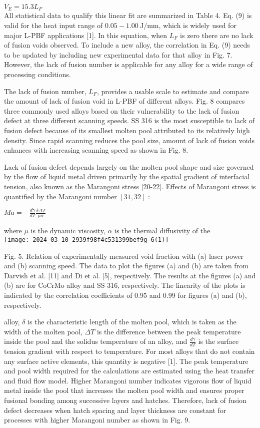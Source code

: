 \documentclass[10pt]{article}
\begin{document}
$V_{E}=15.3 L_{F}$\\
All statistical data to qualify this linear fit are summarized in Table 4. Eq. (9) is valid for the heat input range of $0.05-1.00 \mathrm{~J} / \mathrm{mm}$, which is widely used for major L-PBF applications [1]. In this equation, when $L_{F}$ is zero there are no lack of fusion voids observed. To include a new alloy, the correlation in Eq. (9) needs to be updated by including new experimental data for that alloy in Fig. 7. However, the lack of fusion number is applicable for any alloy for a wide range of processing conditions.

The lack of fusion number, $L_{F}$, provides a usable scale to estimate and compare the amount of lack of fusion void in L-PBF of different alloys. Fig. 8 compares three commonly used alloys based on their vulnerability to the lack of fusion defect at three different scanning speeds. SS 316 is the most susceptible to lack of fusion defect because of its smallest molten pool attributed to its relatively high density. Since rapid scanning reduces the pool size, amount of lack of fusion voids enhances with increasing scanning speed as shown in Fig. 8.

Lack of fusion defect depends largely on the molten pool shape and size governed by the flow of liquid metal driven primarily by the spatial gradient of interfacial tension, also known as the Marangoni stress [20-22]. Effects of Marangoni stress is quantified by the Marangoni number $[31,32]$ :

$M a=-\frac{d \gamma}{d T} \frac{\delta \Delta T}{\mu \alpha}$

where $\mu$ is the dynamic viscosity, $\alpha$ is the thermal diffusivity of the\\
\texttt{[image: 2024\_03\_10\_2939f98f4c531399bef9g-6(1)]}

Fig. 5. Relation of experimentally measured void fraction with (a) laser power and (b) scanning speed. The data to plot the figures (a) and (b) are taken from Darvish et al. [11] and Di et al. [5], respectively. The results at the figures (a) and (b) are for CoCrMo alloy and SS 316, respectively. The linearity of the plots is indicated by the correlation coefficients of 0.95 and 0.99 for figures (a) and (b), respectively.

alloy, $\delta$ is the characteristic length of the molten pool, which is taken as the width of the molten pool, $\Delta T$ is the difference between the peak temperature inside the pool and the solidus temperature of an alloy, and $\frac{d \gamma}{d T}$ is the surface tension gradient with respect to temperature. For most alloys that do not contain any surface active elements, this quantity is negative [1]. The peak temperature and pool width required for the calculations are estimated using the heat transfer and fluid flow model. Higher Marangoni number indicates vigorous flow of liquid metal inside the pool that increases the molten pool width and ensures proper fusional bonding among successive layers and hatches. Therefore, lack of fusion defect decreases when hatch spacing and layer thickness are constant for processes with higher Marangoni number as shown in Fig. 9.
\end{document}
